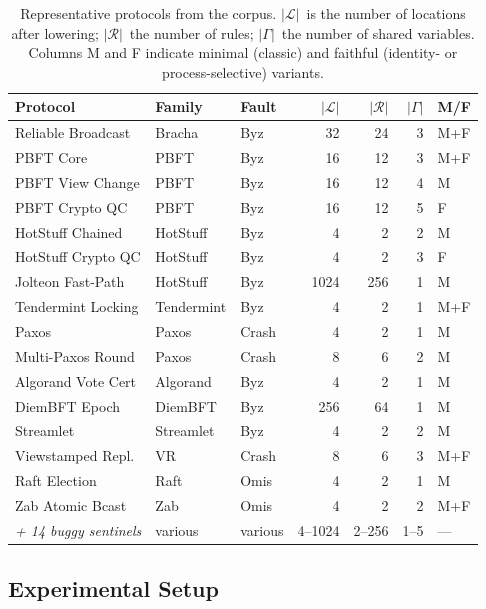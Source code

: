 \begin{table}[t]
\centering
\caption{Representative protocols from the corpus.  $|\mathcal{L}|$~is
the number of locations after lowering; $|\mathcal{R}|$~the number of
rules; $|\Gamma|$~the number of shared variables.  Columns \textsf{M}
and \textsf{F} indicate minimal (classic) and faithful (identity- or
process-selective) variants.}
\label{tab:corpus}
\begin{tabular}{@{}lllrrrl@{}}
\toprule
\textbf{Protocol} & \textbf{Family} & \textbf{Fault} &
  $|\mathcal{L}|$ & $|\mathcal{R}|$ & $|\Gamma|$ & \textsf{M/F} \\
\midrule
Reliable Broadcast  & Bracha      & Byz  &  32 & 24 & 3 & M+F \\
PBFT Core           & PBFT        & Byz  &  16 & 12 & 3 & M+F \\
PBFT View Change    & PBFT        & Byz  &  16 & 12 & 4 & M \\
PBFT Crypto QC      & PBFT        & Byz  &  16 & 12 & 5 & F \\
HotStuff Chained    & HotStuff    & Byz  &   4 &  2 & 2 & M \\
HotStuff Crypto QC  & HotStuff    & Byz  &   4 &  2 & 3 & F \\
Jolteon Fast-Path   & HotStuff    & Byz  & 1024 & 256 & 1 & M \\
Tendermint Locking  & Tendermint  & Byz  &   4 &  2 & 1 & M+F \\
Paxos               & Paxos       & Crash &   4 &  2 & 1 & M \\
Multi-Paxos Round   & Paxos       & Crash &   8 &  6 & 2 & M \\
Algorand Vote Cert  & Algorand    & Byz  &   4 &  2 & 1 & M \\
DiemBFT Epoch       & DiemBFT     & Byz  & 256 & 64 & 1 & M \\
Streamlet           & Streamlet   & Byz  &   4 &  2 & 2 & M \\
Viewstamped Repl.   & VR          & Crash &   8 &  6 & 3 & M+F \\
Raft Election       & Raft        & Omis &   4 &  2 & 1 & M \\
Zab Atomic Bcast    & Zab         & Omis &   4 &  2 & 2 & M+F \\
\emph{+ 14 buggy sentinels} & various & various & 4--1024 & 2--256 & 1--5 & --- \\
\bottomrule
\end{tabular}
\end{table}

\subsection{Experimental Setup}

